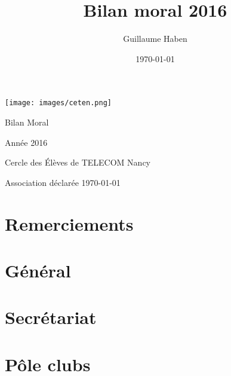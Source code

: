 \documentclass{article} %
\title{Bilan moral 2016}
\author{Guillaume Haben}
\date\today
\begin{document}


	\begin{titlepage}
		\begin{center}
			\texttt{[image: images/ceten.png]}\par
			\vspace{3cm}
			{\Huge \light Bilan Moral}\par
			\vspace{0.5cm}
			{\large \light Année 2016}\par
			\vfill
			{\large Cercle des Élèves de TELECOM Nancy}\par
			{\large \light Association déclarée}
			\vfill
			{\light \today}\par
		\end{center}
	\end{titlepage}


	\tableofcontents



	\clearpage



	\section{Remerciements}
	\section{Général}
	\section{Secrétariat}
	\section{Pôle clubs}
\end{document}
